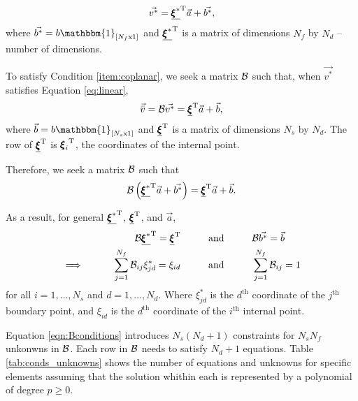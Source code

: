 \begin{equation}
\label{eq:linear}
\vec{v^*} = \underline{{\pmb \xi}^*}^\mathrm{T}\vec{a} + \vec{b^*},
\end{equation}
where $\vec{b^*} = b\mathbbm{1}_{[N_f \mathrm{x} 1]}$ and $\underline{{\pmb \xi}^*}^\mathrm{T}$ is a matrix of dimensions $N_f$ by $N_d$ --number of dimensions.

To satisfy Condition \ref{item:coplanar}, we seek a matrix $\mathcal{B}$ such that, when $\vec{v^*}$ satisfies Equation \ref{eq:linear},
\begin{equation}
\vec{\bar{v}} = \mathcal{B}\vec{v^*} = \underline{{\pmb \xi}}^\mathrm{T} \vec{a} + \vec{b},
\end{equation}
where $\vec{b} = b\mathbbm{1}_{[N_s \mathrm{x} 1]}$ and $\underline{{\pmb \xi}}^\mathrm{T}$ is a matrix of dimensions $N_s$ by $N_d$. The \ith row of $\underline{{\pmb \xi}}^\mathrm{T}$ is ${{\pmb \xi}_i}^\mathrm{T}$, the coordinates of the \ith internal point.

Therefore, we seek a matrix $\mathcal{B}$ such that
\begin{equation}
\mathcal{B}\left(\underline{{\pmb \xi}^*}^\mathrm{T}\vec{a} + \vec{b^*}\right) = \underline{{\pmb \xi}}^\mathrm{T} \vec{a} + \vec{b}.
\end{equation}

As a result, for general $ \underline{{\pmb \xi}^*}^\mathrm{T}$, $\underline{{\pmb \xi}}^\mathrm{T} $, and $\vec{a}$,
\begin{align}
\mathcal{B}\underline{{\pmb \xi}^*}^\mathrm{T} = \underline{{\pmb \xi}}^\mathrm{T}  \hspace{1cm} &\text{and} \hspace{1cm} \mathcal{B}\vec{b^*} = \vec{b}\\
\label{eqn:Bconditions}\implies \hspace{1cm} \sum_{j=1}^{N_f}\mathcal{B}_{ij}\xi^*_{jd} = \xi_{id} \hspace{1cm} &\text{and} \hspace{1cm} \sum_{j = 1}^{N_f} \mathcal{B}_{ij} = 1
\end{align}
for all $i = 1,\dots,N_s$ and $d = 1,\dots,N_d$. Where $\xi^*_{jd}$ is the $d^\text{th}$ coordinate of the $j^\text{th}$ boundary point, and $\xi_{id}$ is the $d^\text{th}$ coordinate of the $i^\text{th}$ internal point.

Equation \ref{eqn:Bconditions} introduces $N_s (N_d + 1)$ constraints for $N_sN_f$ unkonwns in $\mathcal{B}$. Each row in $\mathcal{B}$ needs to satisfy $N_d+1$ equations. Table \ref{tab:conds_unknowns} shows the number of equations and unknowns for specific elements assuming that the solution whithin each is represented by a polynomial of degree $p\ge0$.

